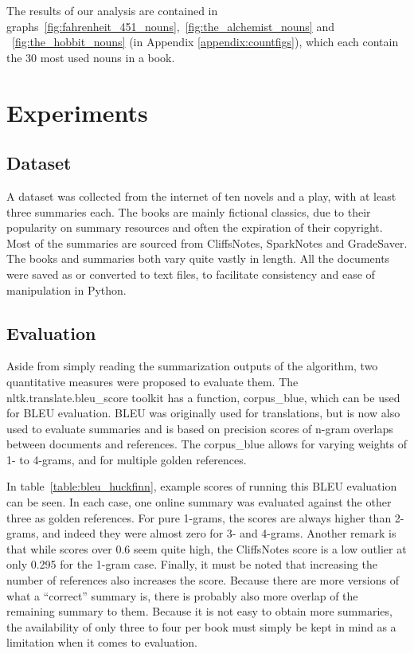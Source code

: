 The results of our analysis are contained in
graphs~\ref{fig:fahrenheit_451_nouns},~\ref{fig:the_alchemist_nouns} and ~\ref{fig:the_hobbit_nouns} (in Appendix \ref{appendix:countfigs}),
which each contain the 30 most used nouns in a book.


\section{Experiments}
\subsection{Dataset}
A dataset was collected from the internet of ten novels and a play, with at
least three summaries each. The books are mainly fictional classics, due to
their popularity on summary resources and often the expiration of their
copyright. Most of the summaries are sourced from CliffsNotes, SparkNotes and
GradeSaver. The books and summaries both vary quite vastly in length. All the
documents were saved as or converted to text files, to facilitate consistency
and ease of manipulation in Python.
\subsection{Evaluation}
Aside from simply reading the summarization outputs of the algorithm, two
quantitative measures were proposed to evaluate them.
The nltk.translate.bleu\_score toolkit has a function, corpus\_blue, which can
be used for BLEU evaluation. BLEU was originally used for translations, but is
now also used to evaluate summaries and is based on precision scores of
n-gram overlaps between documents and references. The corpus\_blue allows for
varying weights of 1- to 4-grams, and for multiple golden references. 

In table~\ref{table:bleu_huckfinn}, example scores of running this BLEU
evaluation can be seen. In each case, one online summary was evaluated against
the other three as golden references. For pure 1-grams, the scores are always
higher than 2-grams, and indeed they were almost zero for 3- and 4-grams.
Another remark is that while scores over 0.6 seem quite high, the CliffsNotes
score is a low outlier at only 0.295 for the 1-gram case. Finally, it must be
noted that increasing the number of references also increases the score.
Because there are more versions of what a ``correct'' summary is, there is
probably also more overlap of the remaining summary to them. Because it is not
easy to obtain more summaries, the availability of only three to four per book
must simply be kept in mind as a limitation when it comes to evaluation.

